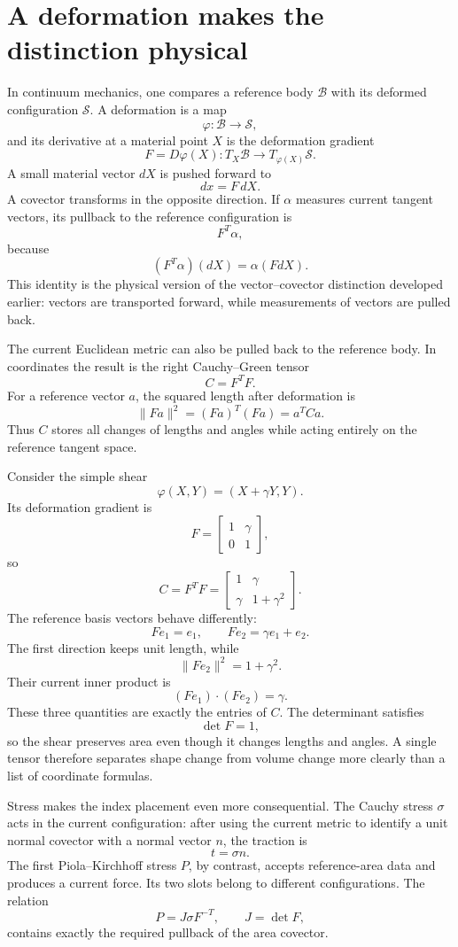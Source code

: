 \section{A deformation makes the distinction physical}

In continuum mechanics, one compares a reference body \(\mathcal B\) with its deformed configuration \(\mathcal S\).  A deformation is a map
\[
  \varphi:\mathcal B\to\mathcal S,
\]
and its derivative at a material point \(X\) is the deformation gradient
\[
  F=D\varphi(X):T_X\mathcal B\to T_{\varphi(X)}\mathcal S.
\]
A small material vector \(dX\) is pushed forward to
\[
  dx=F\,dX.
\]
A covector transforms in the opposite direction.  If \(\alpha\) measures current tangent vectors, its pullback to the reference configuration is
\[
  F^T\alpha,
\]
because
\[
  (F^T\alpha)(dX)=\alpha(FdX).
\]
This identity is the physical version of the vector--covector distinction developed earlier: vectors are transported forward, while measurements of vectors are pulled back.

The current Euclidean metric can also be pulled back to the reference body.  In coordinates the result is the right Cauchy--Green tensor
\[
  C=F^TF.
\]
For a reference vector \(a\), the squared length after deformation is
\[
  \|Fa\|^2
  =(Fa)^T(Fa)
  =a^TCa.
\]
Thus \(C\) stores all changes of lengths and angles while acting entirely on the reference tangent space.

Consider the simple shear
\[
  \varphi(X,Y)=(X+\gamma Y,Y).
\]
Its deformation gradient is
\[
  F=
  \begin{bmatrix}
    1&\gamma\\
    0&1
  \end{bmatrix},
\]
so
\[
  C=F^TF
  =
  \begin{bmatrix}
    1&\gamma\\
    \gamma&1+\gamma^2
  \end{bmatrix}.
\]
The reference basis vectors behave differently:
\[
  Fe_1=e_1,
  \qquad
  Fe_2=\gamma e_1+e_2.
\]
The first direction keeps unit length, while
\[
  \|Fe_2\|^2=1+\gamma^2.
\]
Their current inner product is
\[
  (Fe_1)\cdot(Fe_2)=\gamma.
\]
These three quantities are exactly the entries of \(C\).  The determinant satisfies
\[
  \det F=1,
\]
so the shear preserves area even though it changes lengths and angles.  A single tensor therefore separates shape change from volume change more clearly than a list of coordinate formulas.

Stress makes the index placement even more consequential.  The Cauchy stress \(\sigma\) acts in the current configuration: after using the current metric to identify a unit normal covector with a normal vector \(n\), the traction is
\[
  t=\sigma n.
\]
The first Piola--Kirchhoff stress \(P\), by contrast, accepts reference-area data and produces a current force.  Its two slots belong to different configurations.  The relation
\[
  P=J\sigma F^{-T},
  \qquad
  J=\det F,
\]
contains exactly the required pullback of the area covector.

